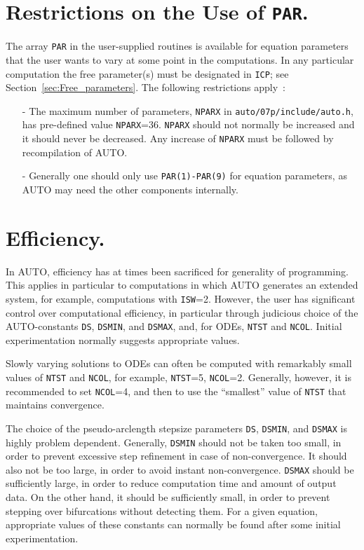 \documentclass[12pt]{report}
\begin{document}
\section{ Restrictions on the Use of {\tt PAR}.} \label{sec:Restrictions_on_PAR}
The array {\tt PAR} in the user-supplied routines is available
for equation parameters that the user wants to vary at some point
in the computations.
In any particular computation the free parameter(s) must be designated
in {\tt ICP}; see Section~\ref{sec:Free_parameters}.
The following restrictions apply~:

\begin{itemize}
\item[-]
  The maximum number of parameters, {\tt NPARX} in {\tt auto/07p/include/auto.h},
  has pre-defined value {\tt NPARX}=36.  {\tt NPARX} should not normally be increased
  and it should never be decreased.
  Any increase of {\tt NPARX} must be followed by recompilation of {\cal AUTO}.
\item[-]
  Generally one should only use {\tt PAR(1)-PAR(9)} for equation parameters,
  as {\cal AUTO} may need the other components internally.  
\end{itemize}

\section{ Efficiency.} \label{sec:Efficiency}
In {\cal AUTO}, efficiency has at times been sacrificed for generality of programming.
This applies in particular to computations in which {\cal AUTO} generates
an extended system, for example, computations with {\tt ISW}=2.
However, the user has significant control over computational efficiency,
in particular through judicious choice of the {\cal AUTO}-constants  
{\tt DS}, {\tt DSMIN}, and {\tt DSMAX}, and, for ODEs, {\tt NTST} and {\tt NCOL}.
Initial experimentation normally suggests appropriate values.

Slowly varying solutions to ODEs can often 
be computed with remarkably small values of {\tt NTST} and {\tt NCOL}, 
for example, {\tt NTST}=5,  {\tt NCOL}=2.
Generally, however, it is recommended to set {\tt NCOL}=4,
and then to use the ``smallest'' value of {\tt NTST} that maintains convergence.

The choice of the pseudo-arclength stepsize parameters
{\tt DS}, {\tt DSMIN}, and {\tt DSMAX}
is highly problem dependent.
Generally, {\tt DSMIN} should not be taken too small,
in order to prevent excessive step refinement in case of non-convergence.
It should also not be too large, in order to avoid instant non-convergence.
{\tt DSMAX} should be sufficiently large, in order to reduce computation time
and amount of output data.
On the other hand, it should be sufficiently small, in order to prevent
stepping over bifurcations without detecting them.
For a given equation, appropriate values of these constants 
can normally be found after some initial experimentation.
\end{document}
